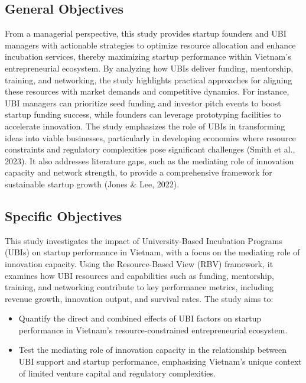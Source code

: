 \documentclass[../Main.tex]{subfiles}
\begin{document}
	\subsection{General Objectives}
	From a managerial perspective, this study provides startup founders and UBI managers with actionable strategies to optimize resource allocation and enhance incubation services, thereby maximizing startup performance within Vietnam's entrepreneurial ecosystem. By analyzing how UBIs deliver funding, mentorship, training, and networking, the study highlights practical approaches for aligning these resources with market demands and competitive dynamics. For instance, UBI managers can prioritize seed funding and investor pitch events to boost startup funding success, while founders can leverage prototyping facilities to accelerate innovation. The study emphasizes the role of UBIs in transforming ideas into viable businesses, particularly in developing economies where resource constraints and regulatory complexities pose significant challenges (Smith et al., 2023). It also addresses literature gaps, such as the mediating role of innovation capacity and network strength, to provide a comprehensive framework for sustainable startup growth (Jones \& Lee, 2022).

	\subsection{Specific Objectives}
	This study investigates the impact of University-Based Incubation Programs (UBIs) on startup performance in Vietnam, with a focus on the mediating role of innovation capacity. Using the Resource-Based View (RBV) framework, it examines how UBI resources and capabilities such as funding, mentorship, training, and networking contribute to key performance metrics, including revenue growth, innovation output, and survival rates. The study aims to:
	\begin{itemize}
		\item Quantify the direct and combined effects of UBI factors on startup performance in Vietnam's resource-constrained entrepreneurial ecosystem.
		\item Test the mediating role of innovation capacity in the relationship between UBI support and startup performance, emphasizing Vietnam's unique context of limited venture capital and regulatory complexities.
	\end{itemize}
\end{document}
